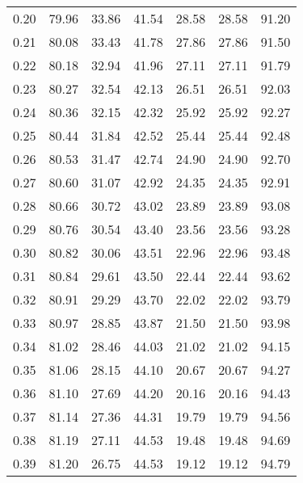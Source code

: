\begin{tabular}{|c|c|c|c|c|c|c|}
      0.20 &     79.96 &     33.86 &      41.54 &   28.58 &      28.58 &         91.20 \\
      0.21 &     80.08 &     33.43 &      41.78 &   27.86 &      27.86 &         91.50 \\
      0.22 &     80.18 &     32.94 &      41.96 &   27.11 &      27.11 &         91.79 \\
      0.23 &     80.27 &     32.54 &      42.13 &   26.51 &      26.51 &         92.03 \\
      0.24 &     80.36 &     32.15 &      42.32 &   25.92 &      25.92 &         92.27 \\
      0.25 &     80.44 &     31.84 &      42.52 &   25.44 &      25.44 &         92.48 \\
      0.26 &     80.53 &     31.47 &      42.74 &   24.90 &      24.90 &         92.70 \\
      0.27 &     80.60 &     31.07 &      42.92 &   24.35 &      24.35 &         92.91 \\
      0.28 &     80.66 &     30.72 &      43.02 &   23.89 &      23.89 &         93.08 \\
      0.29 &     80.76 &     30.54 &      43.40 &   23.56 &      23.56 &         93.28 \\
      0.30 &     80.82 &     30.06 &      43.51 &   22.96 &      22.96 &         93.48 \\
      0.31 &     80.84 &     29.61 &      43.50 &   22.44 &      22.44 &         93.62 \\
      0.32 &     80.91 &     29.29 &      43.70 &   22.02 &      22.02 &         93.79 \\
      0.33 &     80.97 &     28.85 &      43.87 &   21.50 &      21.50 &         93.98 \\
      0.34 &     81.02 &     28.46 &      44.03 &   21.02 &      21.02 &         94.15 \\
      0.35 &     81.06 &     28.15 &      44.10 &   20.67 &      20.67 &         94.27 \\
      0.36 &     81.10 &     27.69 &      44.20 &   20.16 &      20.16 &         94.43 \\
      0.37 &     81.14 &     27.36 &      44.31 &   19.79 &      19.79 &         94.56 \\
      0.38 &     81.19 &     27.11 &      44.53 &   19.48 &      19.48 &         94.69 \\
      0.39 &     81.20 &     26.75 &      44.53 &   19.12 &      19.12 &         94.79 \\

\end{tabular}
